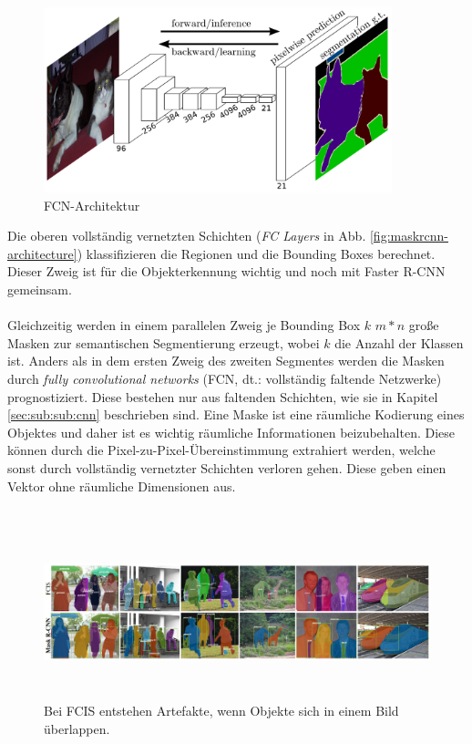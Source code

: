 \begin{figure}[ht]
  \centering
  \includegraphics[width=0.90\textwidth]{pics/fcn-architecture.PNG}
  \caption[FCN-Architektur]{FCN-Architektur\cite{ref:mask-rcnn-architecture}}
  \label{fig:fcn-architecture}
\end{figure}
\noindent
Die oberen vollständig vernetzten Schichten (\textit{FC Layers} in Abb. \ref{fig:maskrcnn-architecture}) klassifizieren die Regionen und die Bounding Boxes berechnet. Dieser Zweig ist für die Objekterkennung wichtig und noch mit Faster R-CNN gemeinsam. 
\\\\
Gleichzeitig werden in einem parallelen Zweig je Bounding Box $k$ $m*n$ große Masken zur semantischen Segmentierung erzeugt, wobei $k$ die Anzahl der Klassen ist.  Anders als in dem ersten Zweig des zweiten Segmentes werden die Masken durch \textit{fully convolutional networks} (FCN, dt.: vollständig faltende Netzwerke) prognostiziert. Diese bestehen nur aus faltenden Schichten, wie sie in Kapitel \ref{sec:sub:sub:cnn} beschrieben sind. Eine Maske ist eine räumliche Kodierung eines Objektes und daher ist es wichtig räumliche Informationen beizubehalten. Diese können durch die Pixel-zu-Pixel-Übereinstimmung extrahiert werden, welche sonst durch vollständig vernetzter Schichten verloren gehen. Diese geben einen Vektor ohne räumliche Dimensionen aus.\cite{ref:maskrcnn}
\\\\
\begin{figure}[ht]
  \centering
  \includegraphics[width=\textwidth, height=5cm]{pics/mrcnn-vs-fcis.PNG}
  \caption[Mask R-CNN vs. FCIS]{Bei FCIS entstehen Artefakte, wenn Objekte sich in einem Bild überlappen.\cite{ref:maskrcnn}}
  \label{fig:maskvsfcis}
\end{figure}

